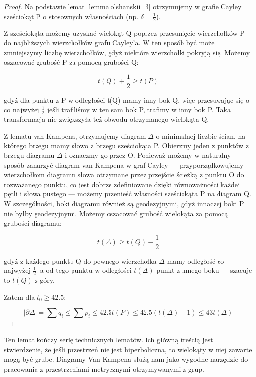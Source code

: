 \documentclass[licencjacka]{pracamgr}
\begin{document}
\begin{proof}

Na podstawie lemat \ref{lemma:olshanskii_3} otrzymujemy w grafie Cayley sześciokąt P o stosownych własnościach (np. $\delta = \frac{1}{2}$).

Z sześciokąta możemy uzyskać wielokąt Q poprzez przesunięcie wierzchołków P do najbliższych wierzchołków grafu Cayley'a. W ten sposób być może zmniejszymy liczbę wierzchołków, gdyż niektóre wierzchołki pokryją się. Możemy oszacować grubość P za pomocą grubości Q:

\[ t(Q) + \frac{1}{2} \geq t(P) \]

\noindent
gdyż dla punktu z P w odległości t(Q) mamy inny bok Q, więc przesuwając się o co najwyżej $\frac{1}{2}$ jeśli trafiliśmy w ten sam bok P, trafimy w inny bok P. Taka transformacja nie zwiększyła też obwodu otrzymanego wielokąta Q.

Z lematu van Kampena, otrzymujemy diagram $\Delta$ o minimalnej liczbie ścian, na którego brzegu mamy słowo z brzegu sześciokąta P. Obierzmy jeden z punktów z brzegu diagramu $\Delta$ i oznaczmy go przez O. Ponieważ możemy w naturalny sposób zanurzyć diagram van Kampena w graf Cayley — przyporządkowujemy wierzchołkom diagramu słowa otrzymane przez przejście ścieżką z punktu O do rozważanego punktu, co jest dobrze zdefiniowane dzięki równoważności każdej pętli i słowa pustego — możemy przenieść własności sześciokąta P na diagram Q. W szczególności, boki diagramu również są geodezyjnymi, gdyż innaczej boki P nie byłby geodezyjnymi. Możemy oszacować grubość wielokąta za pomocą grubości diagramu:

\[ t(\Delta) \geq t(Q) - \frac{1}{2} \]

\noindent
gdyż z każdego punktu Q do pewnego wierzchołka $\Delta$ mamy odległość co najwyżej $\frac{1}{2}$, a od tego punktu w odległości $t(\Delta)$ punkt z innego boku — szacuje to $t(Q)$ z góry.

Zatem dla $t_{0} \geq 42.5$:

\[ |\partial \Delta| = \sum q_{i} \leq \sum p_{i} \leq 42.5t(P) \leq 42.5(t(\Delta) + 1) \leq 43 t(\Delta) \]

\end{proof}

Ten lemat kończy serię technicznych lematów. Ich główną treścią jest stwierdzenie, że jeśli przestrzeń nie jest hiperboliczna, to wielokąty w niej zawarte mogą być grube. Diagramy Van Kampena służą nam jako wygodne narzędzie do pracowania z przestrzeniami metrycznymi otrzymywanymi z grup.
\end{document}
